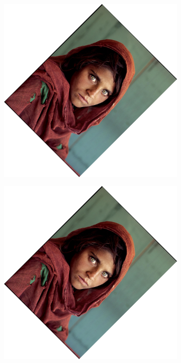 \documentclass{article}
\begin{document}
\begin{figure}[H]
    \centering
    \begin{subfigure}{.3\textwidth}
        \centering
        \includegraphics[scale=0.04]{q1/output/similar_2_0.5_2.jpg}
    \end{subfigure}
    \begin{subfigure}{.3\textwidth}
        \centering
        \includegraphics[scale=0.04]{q1/output/similar_2_1_2.jpg}

\end{subfigure}
\end{figure}
\end{document}
